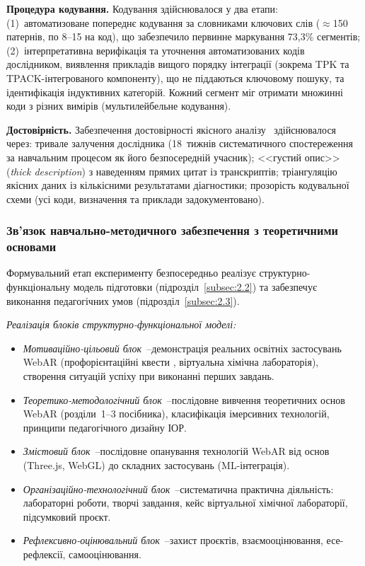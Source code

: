 \textbf{Процедура кодування.} Кодування здійснювалося у два етапи: (1)~автоматизоване попереднє кодування за словниками ключових слів ($\approx$150 патернів, по 8--15 на код), що забезпечило первинне маркування 73{,}3\% сегментів; (2)~інтерпретативна верифікація та уточнення автоматизованих кодів дослідником, виявлення прикладів вищого порядку інтеграції (зокрема TPK та TPACK-інтегрованого компоненту), що не піддаються ключовому пошуку, та ідентифікація індуктивних категорій. Кожний сегмент міг отримати множинні коди з різних вимірів (мультилейбельне кодування).

\textbf{Достовірність.} Забезпечення достовірності якісного аналізу~\cite{Saldana2021Coding} здійснювалося через: тривале залучення дослідника (18~тижнів систематичного спостереження за навчальним процесом як його безпосередній учасник); <<густий опис>> (\textit{thick description}) з наведенням прямих цитат із транскриптів; тріангуляцію якісних даних із кількісними результатами діагностики; прозорість кодувальної схеми (усі коди, визначення та приклади задокументовано).

\subsubsection{Зв'язок навчально-методичного забезпечення з теоретичними основами}

Формувальний етап експерименту безпосередньо реалізує структурно-функціональну модель підготовки (підрозділ~\ref{subsec:2.2}) та забезпечує виконання педагогічних умов (підрозділ~\ref{subsec:2.3}).

\textit{Реалізація блоків структурно-функціональної моделі:}
\begin{itemize}
\item \textit{Мотиваційно-цільовий блок}~--демонстрація реальних освітніх застосувань WebAR (профорієнтаційні квести \cite{Shepiliev2021Career}, віртуальна хімічна лабораторія), створення ситуацій успіху при виконанні перших завдань.
\item \textit{Теоретико-методологічний блок}~--послідовне вивчення теоретичних основ WebAR (розділи~1--3 посібника), класифікація імерсивних технологій, принципи педагогічного дизайну ІОР.
\item \textit{Змістовий блок}~--послідовне опанування технологій WebAR від основ (Three.js, WebGL) до складних застосувань (ML-інтеграція).
\item \textit{Організаційно-технологічний блок}~--систематична практична діяльність: лабораторні роботи, творчі завдання, кейс віртуальної хімічної лабораторії, підсумковий проєкт.
\item \textit{Рефлексивно-оцінювальний блок}~--захист проєктів, взаємооцінювання, есе-рефлексії, самооцінювання.
\end{itemize}

